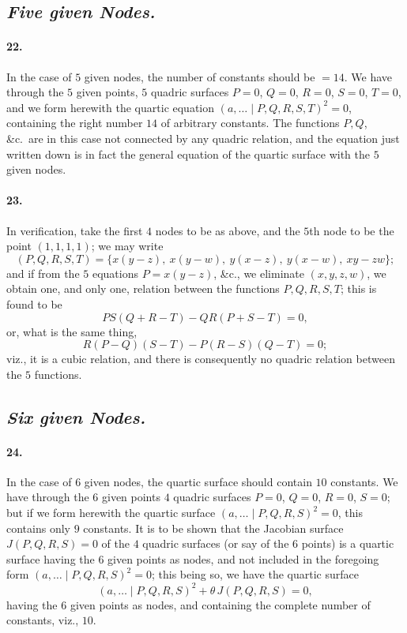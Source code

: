 \documentclass[11pt,a4paper]{article}
\begin{document}
\subsection*{\textit{Five given Nodes.}}

\paragraph{22.}
In the case of $5$ given nodes, the number of constants should be $= 14$. We have through
the $5$ given points, $5$ quadric surfaces $P = 0$, $Q = 0$, $R = 0$, $S = 0$, $T = 0$, and
we form herewith the quartic equation $(a, \ldots  \mid P, Q, R, S, T)^2 = 0$,
containing the right number $14$ of arbitrary constants. The functions $P, Q$, \&c.\ are in
this case not connected by any quadric relation, and the equation just written down is in
fact the general equation of the quartic surface with the $5$ given nodes.

\paragraph{23.}
In verification, take the first $4$ nodes to be as above, and the $5$th node to be the
point $(1, 1, 1, 1)$; we may write
\[
(P, Q, R, S, T) = \{x(y - z),\ x(y - w),\ y(x - z),\ y(x - w),\ xy - zw\};
\]
and if from the $5$ equations $P = x(y - z)$, \&c., we eliminate $(x, y, z, w)$, we obtain
one, and only one, relation between the functions $P, Q, R, S, T$; this is found to be
\[
PS(Q + R - T) - QR(P + S - T) = 0,
\]
or, what is the same thing,
\[
R(P - Q)(S - T) - P(R - S)(Q - T) = 0;
\]
viz., it is a cubic relation, and there is consequently no quadric relation between the $5$
functions.

\subsection*{\textit{Six given Nodes.}}

\paragraph{24.}
In the case of $6$ given nodes, the quartic surface should contain $10$ constants. We have
through the $6$ given points $4$ quadric surfaces $P = 0$, $Q = 0$, $R = 0$, $S = 0$; but
if we form herewith the quartic surface $(a, \ldots  \mid P, Q, R, S)^2 = 0$, this
contains only $9$ constants. It is to be shown that the Jacobian surface $J(P, Q, R, S) = 0$
of the $4$ quadric surfaces (or say of the $6$ points) is a quartic surface having the $6$
given points as nodes, and not included in the foregoing form $(a, \ldots  \mid P, Q, R, S)^2 = 0$;
this being so, we have the quartic surface
\[
(a, \ldots  \mid P, Q, R, S)^2 + \theta\,J(P, Q, R, S) = 0,
\]
having the $6$ given points as nodes, and containing the complete number of constants,
viz., $10$.
\end{document}
